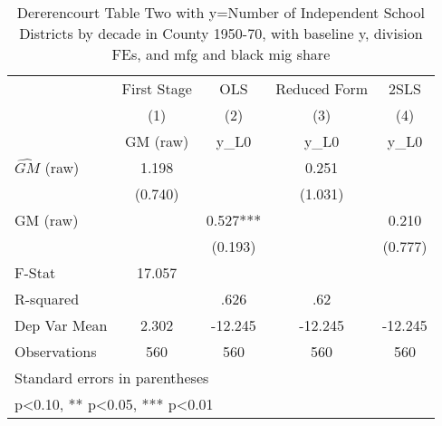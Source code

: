 \begin{table}[htbp]\centering
\def\sym#1{\ifmmode^{#1}\else\(^{#1}\)\fi}
\caption{Dererencourt Table Two with y=Number of Independent School Districts by decade in County 1950-70, with baseline y, division FEs, and mfg and black mig share}
\begin{tabular}{l*{4}{c}}
\toprule
                    & First Stage   &         OLS   &Reduced Form   &        2SLS   \\
                    &\multicolumn{1}{c}{(1)}&\multicolumn{1}{c}{(2)}&\multicolumn{1}{c}{(3)}&\multicolumn{1}{c}{(4)}\\
                    &\multicolumn{1}{c}{GM  (raw)}&\multicolumn{1}{c}{y\_L0}&\multicolumn{1}{c}{y\_L0}&\multicolumn{1}{c}{y\_L0}\\
\midrule
$\hat{GM}$ (raw)    &       1.198   &               &       0.251   &               \\
                    &     (0.740)   &               &     (1.031)   &               \\
\addlinespace
GM  (raw)           &               &       0.527***&               &       0.210   \\
                    &               &     (0.193)   &               &     (0.777)   \\
\midrule
F-Stat              &      17.057   &               &               &               \\
R-squared           &               &        .626   &         .62   &               \\
Dep Var Mean        &       2.302   &     -12.245   &     -12.245   &     -12.245   \\
Observations        &         560   &         560   &         560   &         560   \\
\bottomrule
\multicolumn{5}{l}{\footnotesize Standard errors in parentheses}\\
\multicolumn{5}{l}{\footnotesize * p<0.10, ** p<0.05, *** p<0.01}\\
\end{tabular}
\end{table}
